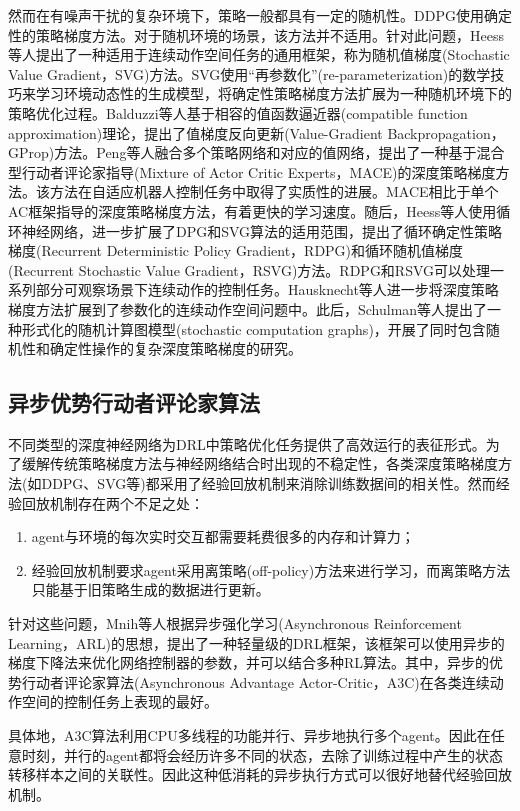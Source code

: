 \documentclass[bachelor]{thesis-uestc}
\begin{document}
	然而在有噪声干扰的复杂环境下，策略一般都具有一定的随机性。DDPG使用确定性的策略梯度方法。对于随机环境的场景，该方法并不适用。针对此问题，Heess等人提出了一种适用于连续动作空间任务的通用框架，称为随机值梯度(Stochastic Value Gradient，SVG)方法。SVG使用“再参数化”(re-parameterization)的数学技巧来学习环境动态性的生成模型，将确定性策略梯度方法扩展为一种随机环境下的策略优化过程。Balduzzi等人基于相容的值函数逼近器(compatible function approximation)理论，提出了值梯度反向更新(Value-Gradient Backpropagation，GProp)方法。Peng等人融合多个策略网络和对应的值网络，提出了一种基于混合型行动者评论家指导(Mixture of Actor Critic Experts，MACE)的深度策略梯度方法。该方法在自适应机器人控制任务中取得了实质性的进展。MACE相比于单个AC框架指导的深度策略梯度方法，有着更快的学习速度。随后，Heess等人使用循环神经网络，进一步扩展了DPG和SVG算法的适用范围，提出了循环确定性策略梯度(Recurrent Deterministic Policy Gradient，RDPG)和循环随机值梯度(Recurrent Stochastic Value Gradient，RSVG)方法。RDPG和RSVG可以处理一系列部分可观察场景下连续动作的控制任务。Hausknecht等人进一步将深度策略梯度方法扩展到了参数化的连续动作空间问题中。此后，Schulman等人提出了一种形式化的随机计算图模型(stochastic computation graphs)，开展了同时包含随机性和确定性操作的复杂深度策略梯度的研究。
	
	\subsection{异步优势行动者评论家算法}
	不同类型的深度神经网络为DRL中策略优化任务提供了高效运行的表征形式。为了缓解传统策略梯度方法与神经网络结合时出现的不稳定性，各类深度策略梯度方法(如DDPG、SVG等)都采用了经验回放机制来消除训练数据间的相关性。然而经验回放机制存在两个不足之处：
	\begin{enumerate}
		\item agent与环境的每次实时交互都需要耗费很多的内存和计算力；
		\item 经验回放机制要求agent采用离策略(off-policy)方法来进行学习，而离策略方法只能基于旧策略生成的数据进行更新。
	\end{enumerate}
	针对这些问题，Mnih等人根据异步强化学习(Asynchronous Reinforcement Learning，ARL)的思想，提出了一种轻量级的DRL框架，该框架可以使用异步的梯度下降法来优化网络控制器的参数，并可以结合多种RL算法。其中，异步的优势行动者评论家算法(Asynchronous Advantage Actor-Critic，A3C)在各类连续动作空间的控制任务上表现的最好。
	
	具体地，A3C算法利用CPU多线程的功能并行、异步地执行多个agent。因此在任意时刻，并行的agent都将会经历许多不同的状态，去除了训练过程中产生的状态转移样本之间的关联性。因此这种低消耗的异步执行方式可以很好地替代经验回放机制。
	
\end{document}
